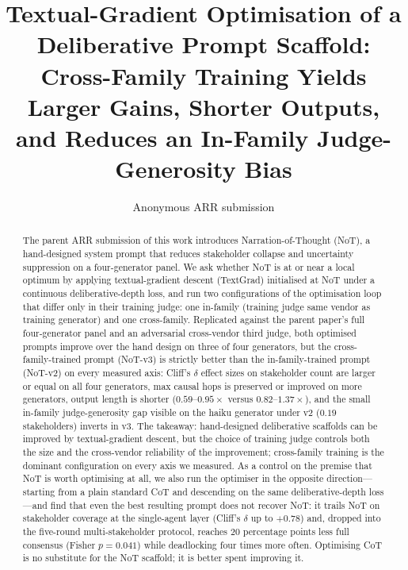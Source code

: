 \documentclass[11pt]{article}
\title{Textual-Gradient Optimisation of a Deliberative Prompt Scaffold:\\
Cross-Family Training Yields Larger Gains, Shorter Outputs,\\
and Reduces an In-Family Judge-Generosity Bias}
\author{Anonymous ARR submission}
\begin{document}
\maketitle

\begin{abstract}
The parent ARR submission of this work introduces Narration-of-Thought (NoT), a hand-designed system prompt that reduces stakeholder collapse and uncertainty suppression on a four-generator panel.
We ask whether NoT is at or near a local optimum by applying textual-gradient descent (TextGrad) initialised at NoT under a continuous deliberative-depth loss, and run two configurations of the optimisation loop that differ only in their training judge: one in-family (training judge same vendor as training generator) and one cross-family.
Replicated against the parent paper's full four-generator panel and an adversarial cross-vendor third judge, both optimised prompts improve over the hand design on three of four generators, but the cross-family-trained prompt (NoT-v3) is strictly better than the in-family-trained prompt (NoT-v2) on every measured axis: Cliff's $\delta$ effect sizes on stakeholder count are larger or equal on all four generators, max causal hops is preserved or improved on more generators, output length is shorter ($0.59$--$0.95\times$ versus $0.82$--$1.37\times$), and the small in-family judge-generosity gap visible on the haiku generator under v2 ($0.19$ stakeholders) inverts in v3.
The takeaway: hand-designed deliberative scaffolds can be improved by textual-gradient descent, but the choice of training judge controls both the size and the cross-vendor reliability of the improvement; cross-family training is the dominant configuration on every axis we measured.
As a control on the premise that NoT is worth optimising at all, we also run the optimiser in the opposite direction---starting from a plain standard CoT and descending on the same deliberative-depth loss---and find that even the best resulting prompt does not recover NoT: it trails NoT on stakeholder coverage at the single-agent layer (Cliff's $\delta$ up to $+0.78$) and, dropped into the five-round multi-stakeholder protocol, reaches $20$ percentage points less full consensus (Fisher $p = 0.041$) while deadlocking four times more often. Optimising CoT is no substitute for the NoT scaffold; it is better spent improving it.
\end{abstract}
\end{document}
